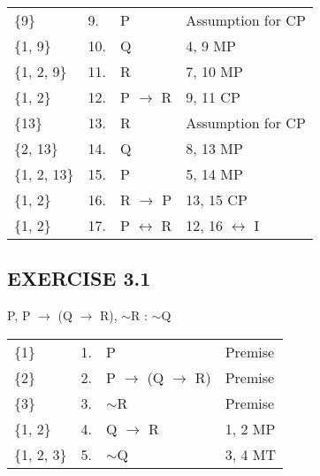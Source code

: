 \documentclass[a4paper,12pt]{article}
\newcommand{\ra}{$\rightarrow$ }
\newcommand{\lra}{$\leftrightarrow$ }
\newcommand{\s}{$\sim$}
\begin{document}
\begin{enumerate}[label=\arabic*,leftmargin=*]
\begin{enumerate}[label=\arabic*.]
\begin{minipage}{\textwidth}
\begin{tabular}{l l l l}
                        \{9\} & 9. & P & Assumption for CP\\
                        \{1, 9\} & 10. & Q & 4, 9 MP\\
                        \{1, 2, 9\} & 11. & R & 7, 10 MP\\
                        \{1, 2\} & 12. & P \ra R & 9, 11 CP\\
                        \{13\} & 13. & R & Assumption for CP\\
                        \{2, 13\} & 14. & Q & 8, 13 MP\\
                        \{1, 2, 13\} & 15. & P & 5, 14 MP\\
                        \{1, 2\} & 16. & R \ra P & 13, 15 CP\\
                        \{1, 2\} & 17. & P \lra R & 12, 16 \lra I\\
                    \end{tabular}
                \end{minipage}

            \end{enumerate}

    \end{enumerate}

    \subsection*{EXERCISE 3.1}

    \begin{enumerate}[label=\arabic*,leftmargin=*]

        \begin{minipage}{\textwidth}
        \item P, P \ra (Q \ra R), \s R : \s Q
            \nopagebreak
            \vspace{1em}\\
            \begin{tabular}{l l l l}
                \{1\} & 1. & P & Premise\\
                \{2\} & 2. & P \ra (Q \ra R) & Premise\\
                \{3\} & 3. & \s R & Premise\\
                \{1, 2\} & 4. & Q \ra R & 1, 2 MP\\
                \{1, 2, 3\} & 5. & \s Q & 3, 4 MT\\
            \end{tabular}
        \end{minipage}

    \end{enumerate}
\end{document}
